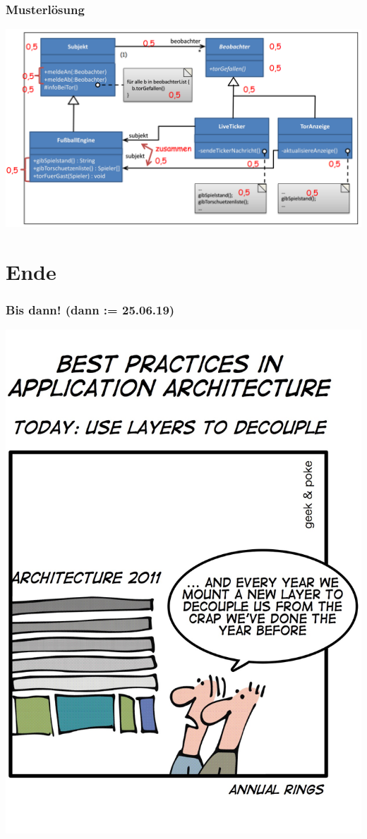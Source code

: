 \documentclass[18pt]{beamer}
\begin{document}
	\begin{frame}
		\frametitle{Musterlösung}
		\includegraphics[scale=0.35]{./pics/tut3/obs-task-sol.png}
	\end{frame}
	
\section{Ende}	
	\begin{frame}
		\frametitle{Bis dann! (dann  := 25.06.19)}
		\centering
		\includegraphics[scale=0.55]{./comics/footprints2.jpg}
	\end{frame}
\end{document}

